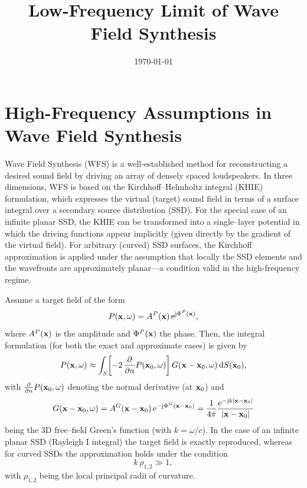 \documentclass[11pt]{article}
\begin{document}
\title{Low-Frequency Limit of Wave Field Synthesis}
\date{\today}  
\maketitle

\section{High-Frequency Assumptions in Wave Field Synthesis}

Wave Field Synthesis (WFS) is a well‐established method for reconstructing a desired sound field by driving an array of densely spaced loudspeakers. In three dimensions, WFS is based on the Kirchhoff–Helmholtz integral (KHIE) formulation, which expresses the virtual (target) sound field in terms of a surface integral over a secondary source distribution (SSD). For the special case of an infinite planar SSD, the KHIE can be transformed into a single–layer potential in which the driving functions appear implicitly (given directly by the gradient of the virtual field). For arbitrary (curved) SSD surfaces, the Kirchhoff approximation is applied under the assumption that locally the SSD elements and the wavefronts are approximately planar—a condition valid in the high-frequency regime.

Assume a target field of the form
\begin{equation}
    P(\mathbf{x},\omega) = A^P(\mathbf{x})\,\mathrm{e}^{\mathrm{j}\Phi^P(\mathbf{x})},
\end{equation}
where \(A^P(\mathbf{x})\) is the amplitude and \(\Phi^P(\mathbf{x})\) the phase. Then, the integral formulation (for both the exact and approximate cases) is given by
\begin{equation}
    P(\mathbf{x},\omega) \approx \int_S \!\left[-2\,\frac{\partial}{\partial n}P(\mathbf{x}_0,\omega)\right] G(\mathbf{x}-\mathbf{x}_0,\omega)\,\mathrm{d} S(\mathbf{x}_0),
\end{equation}
with \(\frac{\partial}{\partial n}P(\mathbf{x}_0,\omega)\) denoting the normal derivative (at \(\mathbf{x}_0\)) and 
\begin{equation}
    G(\mathbf{x}-\mathbf{x}_0,\omega) = A^G(\mathbf{x}-\mathbf{x}_0)\,\mathrm{e}^{-\mathrm{j}\Phi^G(\mathbf{x}-\mathbf{x}_0)}
    = \frac{1}{4\pi}\frac{\mathrm{e}^{-\mathrm{j} k|\mathbf{x}-\mathbf{x}_0|}}{|\mathbf{x}-\mathbf{x}_0|}
\end{equation}
being the 3D free–field Green’s function (with \(k=\omega/c\)). In the case of an infinite planar SSD (Rayleigh I integral) the target field is exactly reproduced, whereas for curved SSDs the approximation holds under the condition \cite[Eq.~(2.7.12)]{Blenstein1975}
\begin{equation}
    k\,\rho_{1,2} \gg 1,
\end{equation}
with \(\rho_{1,2}\) being the local principal radii of curvature.
\end{document}
